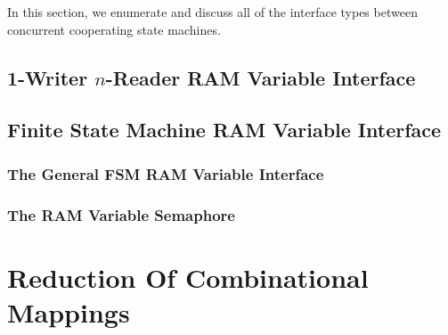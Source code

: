 In this section, we enumerate and discuss all of the interface
types between 
concurrent cooperating state machines.


\subsection[1-Writer $n$-Reader RAM Variable Interface]
           {1-Writer \mbox{\boldmath $n$}-Reader RAM Variable Interface}
\label{cpco0:sist0:sown0}


\subsection{Finite State Machine RAM Variable Interface}
\label{cpco0:sist0:sfsm0}


\subsubsection{The General FSM RAM Variable Interface}
\label{cpco0:sist0:sfsm0:sgfs0}


\subsubsection{The RAM Variable Semaphore}
\label{cpco0:sist0:sfsm0:srvs0}


\section{Reduction Of Combinational Mappings}



